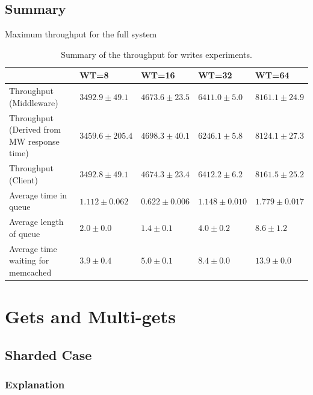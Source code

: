 \documentclass[11pt,a4paper]{article}
\begin{document}
\subsection{Summary} \label{sec:tpfw-summary}
\begin{table}[h]
\small
\centering
{Maximum throughput for the full system}
\begin{tabular}{|p{5.1cm}|p{2.1cm}|p{1.9cm}|p{1.9cm}|p{1.9cm}|}
\hline                                            & WT=8               & WT=16             & WT=32             & WT=64             \\ 
\hline Throughput (Middleware)                    & $3492.9 \pm 49.1$  & $4673.6 \pm 23.5$ & $6411.0 \pm 5.0$  & $8161.1 \pm 24.9$  \\ 
\hline Throughput (Derived from MW response time) & $3459.6 \pm 205.4$ & $4698.3 \pm 40.1$ & $6246.1 \pm 5.8$  & $8124.1 \pm 27.3$ \\ 
\hline Throughput (Client)                        & $3492.8 \pm 49.1$  & $4674.3 \pm 23.4$ & $6412.2 \pm 6.2$  & $8161.5 \pm 25.2$ \\ 
\hline Average time in queue                      & $1.112 \pm 0.062$  & $0.622 \pm 0.006$ & $1.148 \pm 0.010$ & $1.779 \pm 0.017$ \\ 
\hline Average length of queue                    & $2.0 \pm 0.0$      & $1.4 \pm 0.1$     & $4.0 \pm 0.2$     & $8.6 \pm 1.2$     \\ 
\hline Average time waiting for memcached         & $3.9 \pm 0.4$      & $5.0 \pm 0.1$     & $8.4 \pm 0.0$     & $13.9 \pm 0.0$    \\ 
\hline 
\end{tabular}
\caption{Summary of the throughput for writes experiments.} \label{tab:tpfw-summary}
\end{table}

\section{Gets and Multi-gets} \label{sec:gmg}

\subsection{Sharded Case} \label{sec:gmg-true}

\subsubsection{Explanation} \label{sec:gmg-true-exp}
\end{document}
